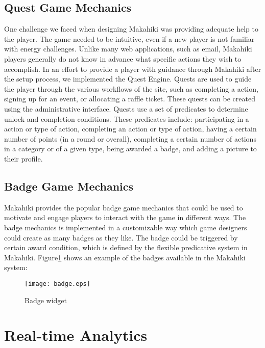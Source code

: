 \subsection{Quest Game Mechanics}

One challenge we faced when designing Makahiki was providing adequate help to the player. The game needed to be intuitive, even if a new player is not familiar with energy challenges. Unlike many web applications, such as email, Makahiki players generally do not know in advance what specific actions they wish to accomplish. In an effort to provide a player with guidance through Makahiki after the setup process, we implemented the Quest Engine. Quests are used to guide the player through the various workflows of the site, such as completing a action, signing up for an event, or allocating a raffle ticket. These quests can be created using the administrative interface. Quests use a set of predicates to determine unlock and completion conditions. These predicates include: participating in a action or type of action, completing an action or type of action, having a certain number of points (in a round or overall), completing a certain number of actions in a category or of a given type, being awarded a badge, and adding a picture to their profile.

\subsection{Badge Game Mechanics}

Makahiki provides the popular badge game mechanics that could be used to motivate and engage players to interact with the game in different ways. The badge mechanics is implemented in a customizable way which game designers could create as many badges as they like. The badge could be triggered by certain award condition, which is defined by the flexible predicative system in Makahiki. Figure\ref{fig:badge} shows an example of the badges available in the Makahiki system:

\begin{figure}[t!]
  \center
  \texttt{[image: badge.eps]}
  \caption{Badge widget}
  \label{fig:badge}
\end{figure}

\section{Real-time Analytics}

